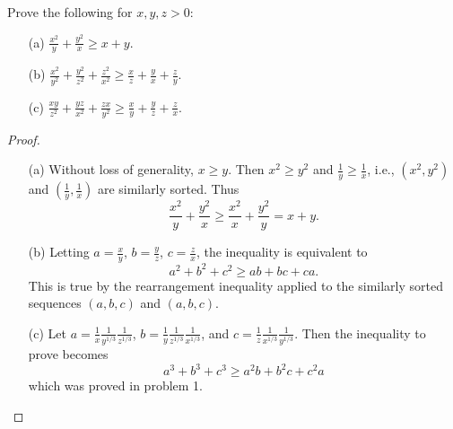 \begin{exercise}
    Prove the following for \( x, y, z > 0 \):
    \begin{enumerate}
        \item[(a)] \(\frac{x^2}{y} + \frac{y^2}{x} \geq x + y\).
        \item[(b)] \(\frac{x^2}{y^2} + \frac{y^2}{z^2} + \frac{z^2}{x^2} \geq \frac{x}{z} + \frac{y}{x} + \frac{z}{y}\).
        \item[(c)] \(\frac{xy}{z^2} + \frac{yz}{x^2} + \frac{zx}{y^2} \geq \frac{x}{y} + \frac{y}{z} + \frac{z}{x}\).
    \end{enumerate}
\end{exercise}
\begin{proof}
    \begin{enumerate}
        \item[(a)] Without loss of generality, \(x \geq y\). Then \(x^2 \geq y^2\) and \(\frac{1}{y} \geq \frac{1}{x}\), i.e., \((x^2, y^2)\) and \((\frac{1}{y}, \frac{1}{x})\) are similarly sorted. Thus
        \[ \frac{x^2}{y} + \frac{y^2}{x} \geq \frac{x^2}{x} + \frac{y^2}{y} = x + y. \]
    
        \item[(b)] Letting \(a = \frac{x}{y}\), \(b = \frac{y}{z}\), \(c = \frac{z}{x}\), the inequality is equivalent to
        \[ a^2 + b^2 + c^2 \geq ab + bc + ca. \]
        This is true by the rearrangement inequality applied to the similarly sorted sequences \((a, b, c)\) and \((a, b, c)\).
    
        \item[(c)] Let \(a = \frac{1}{x}\frac{1}{y^{1/3}}\frac{1}{z^{1/3}}\), \(b = \frac{1}{y}\frac{1}{z^{1/3}}\frac{1}{x^{1/3}}\), and \(c = \frac{1}{z}\frac{1}{x^{1/3}}\frac{1}{y^{1/3}}\). Then the inequality to prove becomes
        \[ a^3 + b^3 + c^3 \geq a^2b + b^2c + c^2a \]
        which was proved in problem 1.
    \end{enumerate}
\end{proof}